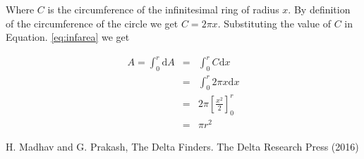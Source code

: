 \documentclass{IEEEtran}
\theoremstyle{definition} \newtheorem{Definition}{Def{\,}inition}
\begin{document}
Where $C$ is the circumference of the infinitesimal ring of radius $x$. By definition of the circumference of the circle we get $C = 2 \pi x$. Substituting the value of $C$ in Equation. \ref{eq:infarea} we get

\begin{eqnarray} \label{eq:area}
	A = \int_0^r \mathrm{d}A &=& \int_0^r C\mathrm{d}x  \nonumber \\
	& = & \int_0^r 2\pi x \mathrm{d}x \nonumber \\
	& = & 2\pi \left[ \frac{x^2}{2}\right]_0^r \nonumber \\
	& = & \pi r^2
\end{eqnarray}

\begin{thebibliography}{99}
		H. Madhav and G. Prakash, The Delta Finders. The Delta Research Press (2016)
\end{thebibliography}
\end{document}
